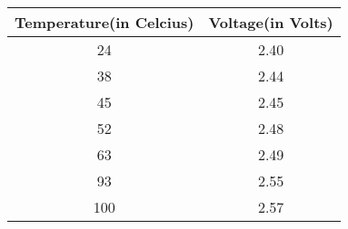 
\begin{center}
\begin{tabular}{|c|c|}
\hline
	\textbf{Temperature(in Celcius)}& \textbf{Voltage(in Volts)}\\ \hline
	24	&2.40	\\ \hline
	38	&2.44	\\ \hline
	45	&2.45   \\ \hline
	52	&2.48   \\ \hline
	63	&2.49   \\ \hline
	93	&2.55	\\ \hline
	100	&2.57	\\ \hline
\end{tabular}
\end{center}

